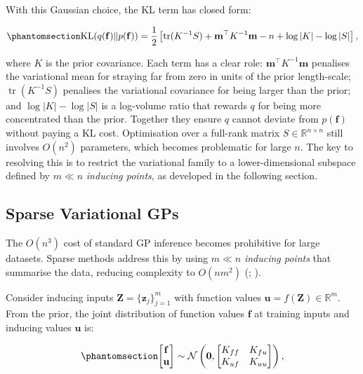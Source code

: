 \documentclass[
  letterpaper,
  DIV=11,
  numbers=noendperiod]{scrartcl}
\begin{document}
With this Gaussian choice, the KL term has closed form:

\begin{equation}\phantomsection\label{eq-kl_gaussian}{
\operatorname{KL}(q(\mathbf{f}) \| p(\mathbf{f})) = \frac{1}{2}\left[\operatorname{tr}(K^{-1}S) + \mathbf{m}^\top K^{-1} \mathbf{m} - n + \log|K| - \log|S|\right],
}\end{equation}

where \(K\) is the prior covariance. Each term has a clear role:
\(\mathbf{m}^\top K^{-1} \mathbf{m}\) penalises the variational mean for
straying far from zero in units of the prior length-scale;
\(\operatorname{tr}(K^{-1}S)\) penalises the variational covariance for
being larger than the prior; and \(\log|K| - \log|S|\) is a log-volume
ratio that rewards \(q\) for being more concentrated than the prior.
Together they ensure \(q\) cannot deviate from \(p(\mathbf{f})\) without
paying a KL cost. Optimisation over a full-rank matrix
\(S \in \mathbb{R}^{n \times n}\) still involves \(O(n^2)\) parameters,
which becomes problematic for large \(n\). The key to resolving this is
to restrict the variational family to a lower-dimensional subspace
defined by \(m \ll n\) \emph{inducing points}, as developed in the
following section.

\subsection{Sparse Variational GPs}\label{sparse-variational-gps}

The \(O(n^3)\) cost of standard GP inference becomes prohibitive for
large datasets. Sparse methods address this by using \(m \ll n\)
\emph{inducing points} that summarise the data, reducing complexity to
\(O(nm^2)\)
(; ).

Consider inducing inputs \(\mathbf{Z} = \{\mathbf{z}_j\}_{j=1}^m\) with
function values \(\mathbf{u} = f(\mathbf{Z}) \in \mathbb{R}^m\). From
the prior, the joint distribution of function values \(\mathbf{f}\) at
training inputs and inducing values \(\mathbf{u}\) is:

\begin{equation}\phantomsection\label{eq-joint_f_u}{
\begin{bmatrix} \mathbf{f} \\ \mathbf{u} \end{bmatrix} \sim \mathcal{N}\left(\mathbf{0}, \begin{bmatrix} K_{ff} & K_{fu} \\ K_{uf} & K_{uu} \end{bmatrix}\right),
}\end{equation}
\end{document}
